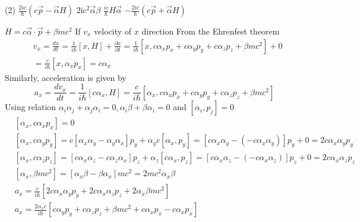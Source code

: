\begin{enumerate}
\begin{minipage}{\textwidth}
\end{minipage}
\begin{tasks}(2)
	\task[\textbf{A.}] $\frac{2 i c}{\hbar}(c \vec{p}-\vec{\alpha} H)$
	\task[\textbf{B.}]$2 \mathrm{ic}^{2} \vec{\alpha} \beta$
	\task[\textbf{C.}]$\frac{i c}{\hbar} H \vec{\alpha}$
	\task[\textbf{D.}]$-\frac{2 i c}{\hbar}(c \vec{p}+\vec{\alpha} H)$
\end{tasks}
\begin{answer}
	$H=c \vec{\alpha} \cdot \vec{p}+\beta m c^{2}$
	If $v_{x}$ velocity of $x$ direction
	From the Ehrenfest theorem\\
	$$
	\begin{aligned}
	&v_{x}=\frac{d x}{d t}=\frac{1}{i \hbar}[x, H]+\frac{\partial x}{\partial t}=\frac{1}{i \hbar}\left[x, c \alpha_{x} p_{x}+c \alpha_{y} p_{y}+c \alpha_{z} p_{z}+\beta m c^{2}\right]+0 \\
	&=\frac{c}{i \hbar}\left[x, \alpha_{x} p_{x}\right]=c \alpha_{x}
	\end{aligned}
	$$
	Similarly, acceleration is given by
	$$
	a_{x}=\frac{d v_{x}}{d t}=\frac{1}{i \hbar}\left[c \alpha_{x}, H\right]=\frac{c}{i \hbar}\left[\alpha_{x}, c \alpha_{x} p_{x}+c \alpha_{y} p_{y}+c \alpha_{z} p_{z}+\beta m c^{2}\right]
	$$
	Using relation $\alpha_{i} \alpha_{j}+\alpha_{j} \alpha_{i}=0, \alpha_{i} \beta+\beta \alpha_{i}=0$ and $\left[\alpha_{i}, p_{j}\right]=0$\\
	\begin{align*}
		&{\left[\alpha_{x}, c \alpha_{x} p_{x}\right]=0} \\
		&{\left[\alpha_{x}, c \alpha_{y} p_{y}\right]=c\left[\alpha_{x} \alpha_{y}-\alpha_{y} \alpha_{x}\right] p_{y}+\alpha_{y} c\left[\alpha_{x}, p_{y}\right]=\left[c \alpha_{x} \alpha_{y}-\left(-c \alpha_{x} \alpha_{y}\right)\right] p_{y}+0=2 c \alpha_{x} \alpha_{y} p_{y}} \\
		&{\left[\alpha_{x}, c \alpha_{z} p_{z}\right]=\left[c \alpha_{x} \alpha_{z}-c \alpha_{z} \alpha_{x}\right] p_{z}+\alpha_{z}\left[c \alpha_{x}, p_{z}\right]=\left[c \alpha_{x} \alpha_{z}-\left(-c \alpha_{x} \alpha_{z}\right)\right] p_{z}+0=2 c \alpha_{x} \alpha_{z} p_{z}} \\
		&{\left[\alpha_{x}, \beta m c^{2}\right]=\left[\alpha_{x} \beta-\beta \alpha_{x}\right] m c^{2}=2 m c^{2} \alpha_{x} \beta}\\
		&a_{x}=\frac{c}{i \hbar}\left[2 c \alpha_{x} \alpha_{y} p_{y}+2 c \alpha_{x} \alpha_{z} p_{z}+2 \alpha_{x} \beta m c^{2}\right] \\
		&a_{x}=\frac{2 \alpha_{x} c}{i \hbar}\left[c \alpha_{y} p_{y}+c \alpha_{z} p_{z}+\beta m c^{2}+c \alpha_{x} p_{x}-c \alpha_{x} p_{x}\right] \\

\end{align*}
\end{answer}
\end{enumerate}
